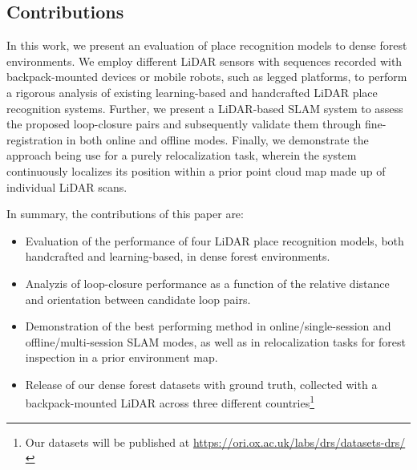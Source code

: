 \subsection*{Contributions}

In this work, we present an evaluation of place recognition models to dense forest environments. We employ different LiDAR sensors with sequences recorded with backpack-mounted devices or mobile robots, such as legged platforms, to perform a rigorous analysis of existing learning-based and handcrafted LiDAR place recognition systems. Further, we present a LiDAR-based SLAM system to assess the proposed loop-closure pairs and subsequently validate them through fine-registration in both online and offline modes. Finally, we demonstrate the approach being use for a purely relocalization task, wherein the system continuously localizes its position within a prior point cloud map made up of individual LiDAR scans.



In summary, the contributions of this paper are:
\begin{itemize}

\item Evaluation of the performance of four LiDAR place recognition models, both handcrafted and learning-based, in dense forest environments.

\item Analyzis of loop-closure performance as a function of the relative distance and orientation between candidate loop pairs.

\item Demonstration of the best performing method in online/single-session and offline/multi-session SLAM modes, as well as in relocalization tasks for forest inspection in a prior environment map. 

\item Release of our dense forest datasets with ground truth, collected with a backpack-mounted LiDAR across three different countries\footnote{Our datasets will be published at \url{https://ori.ox.ac.uk/labs/drs/datasets-drs/}} 
\end{itemize}






